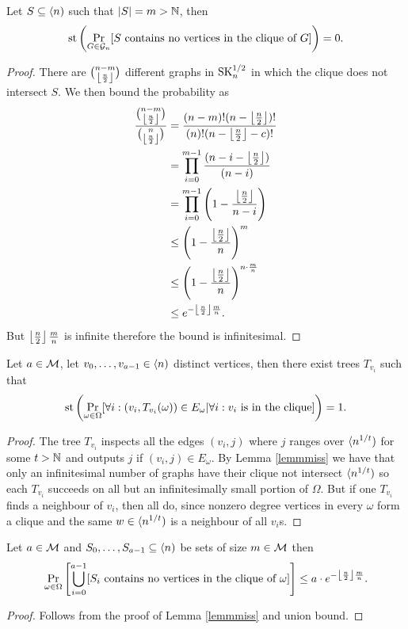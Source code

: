 \begin{lemm}\label{lemmmiss}
Let $S\subseteq \langle n)$ such that $\left|{S}\right|=m > \mathbb{N}$, then
\[\text{st}\left(\Pr_{G\in\mathcal{G}_n}[\text{$S$ contains no vertices in the clique of $G$}]\right)=0.\]
\end{lemm}
\begin{proof}
There are $\binom{n-m}{\left \lfloor {\frac{n}{2}} \right \rfloor}$ different graphs in $\text{SK}_n^{1/2}$ in which the clique does not intersect $S$. We then bound the probability as
\begin{align}
\frac{\binom{n-m}{\left \lfloor {\frac{n}{2}} \right \rfloor}}{\binom{n}{\left \lfloor {\frac{n}{2}} \right \rfloor}}&=\frac{(n-m)!(n-\left \lfloor {\frac{n}{2}} \right \rfloor)!}{(n)!(n-\left \lfloor {\frac{n}{2}} \right \rfloor-c)!}\\
&=\prod_{i=0}^{m-1}\frac{(n-i-\left \lfloor {\frac{n}{2}} \right \rfloor)}{(n-i)}\\
&=\prod_{i=0}^{m-1}\left(1-\frac{\left \lfloor {\frac{n}{2}} \right \rfloor}{n-i}\right)\\
&\leq \left(1-\frac{\left \lfloor {\frac{n}{2}} \right \rfloor}{n}\right)^m\\
&\leq \left(1-\frac{\left \lfloor {\frac{n}{2}} \right \rfloor}{n}\right)^{n \cdot \frac{m}{n}}\\
&\leq e^{-\left \lfloor {\frac{n}{2}} \right \rfloor\frac{m}{n}}.
\end{align}
But $\left \lfloor {\frac{n}{2}} \right \rfloor \frac{m}{n}$ is infinite therefore the bound is infinitesimal.
\end{proof}

\begin{lemm}\label{lemmfindtree}
Let $a\in\mathcal{M}$, let $v_0,\dots,v_{a-1}\in \langle n)$ distinct vertices, then there exist trees $T_{v_i}$ such that
\[\text{st}\left(\Pr_{\omega\in\Omega}[\forall i: (v_i,T_{v_i}(\omega))\in E_\omega|\forall i: \text{$v_i$ is in the clique}]\right)=1.\]
\end{lemm}

\begin{proof}
The tree $T_{v_i}$ inspects all the edges $(v_i,j)$ where $j$ ranges over $\langle n^{1/t})$ for some $t>\mathbb{N}$ and outputs $j$ if $(v_i,j)\in E_\omega$. By Lemma \ref{lemmmiss} we have that only an infinitesimal number of graphs have their clique not intersect $\langle n^{1/t})$ so each $T_{v_i}$ succeeds on all but an infinitesimally small portion of $\Omega$. But if one $T_{v_i}$ finds a neighbour of $v_i$, then all do, since nonzero degree vertices in every $\omega$ form a clique and the same $w\in\langle n^{1/t})$ is a neighbour of all $v_i$s.
\end{proof}

\begin{lemm}\label{lemmmiss2}
Let $a\in\mathcal{M}$ and $S_0,\dots,S_{a-1}\subseteq\langle n)$ be sets of size $m\in \mathcal{M}$ then
\[\Pr_{\omega\in\Omega}\left[\bigcup_{i=0}^{a-1}[\text{$S_i$ contains no vertices in the clique of $\omega$}]\right]\leq a\cdot e^{-\left \lfloor {\frac{n}{2}} \right \rfloor\frac{m}{n}}.\]
\end{lemm}
\begin{proof}Follows from the proof of Lemma \ref{lemmmiss} and union bound.
\end{proof}

